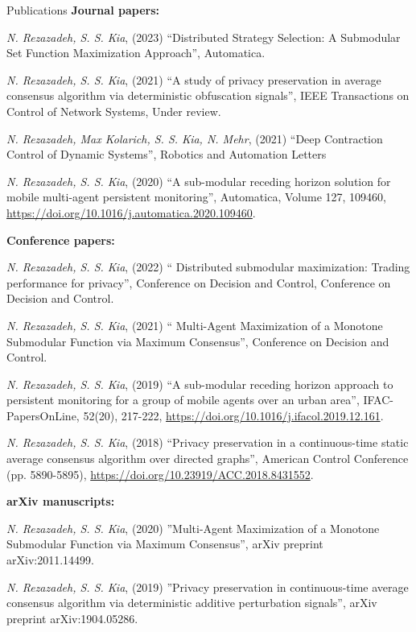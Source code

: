 \begin{rSection}{Publications}
{\large \bf Journal papers:}

{\em N. Rezazadeh, S. S. Kia}, (2023) ``{Distributed Strategy Selection: A Submodular Set Function Maximization Approach}'', Automatica.

{\em N. Rezazadeh, S. S. Kia}, (2021) ``{A study of privacy preservation in average consensus algorithm via deterministic obfuscation signals}'', IEEE Transactions on Control of Network Systems, Under review.

{\em N. Rezazadeh, Max Kolarich, S. S. Kia, N. Mehr}, (2021) ``{Deep Contraction Control of Dynamic Systems}'', Robotics and Automation Letters

{\em N. Rezazadeh, S. S. Kia}, (2020) ``{A sub-modular receding horizon solution for mobile multi-agent persistent monitoring}'', Automatica, Volume 127, 109460, \url{https://doi.org/10.1016/j.automatica.2020.109460}.
 

{\large \bf Conference papers:}

{\em N. Rezazadeh, S. S. Kia}, (2022) `` {Distributed submodular maximization: Trading performance for privacy}'', Conference on Decision and Control, Conference on Decision and Control.

{\em N. Rezazadeh, S. S. Kia}, (2021) `` {Multi-Agent Maximization of a Monotone Submodular Function via Maximum Consensus}'', Conference on Decision and Control.

{\em N. Rezazadeh, S. S. Kia}, (2019) ``{A sub-modular receding horizon approach to persistent monitoring for a group of mobile agents over an urban area}'',  IFAC-PapersOnLine, 52(20), 217-222, \url{https://doi.org/10.1016/j.ifacol.2019.12.161}.

{\em N. Rezazadeh, S. S. Kia}, (2018) ``{Privacy preservation in a continuous-time static average consensus algorithm over directed graphs}'', American Control Conference (pp. 5890-5895), \url{https://doi.org/10.23919/ACC.2018.8431552}.

{\large \bf arXiv manuscripts:}

{\em N. Rezazadeh, S. S. Kia}, (2020) ''{Multi-Agent Maximization of a Monotone Submodular Function via Maximum Consensus}'', arXiv preprint arXiv:2011.14499.

{\em N. Rezazadeh, S. S. Kia}, (2019) ''{Privacy preservation in continuous-time average consensus algorithm via deterministic additive perturbation signals}'', arXiv preprint arXiv:1904.05286.


\end{rSection}